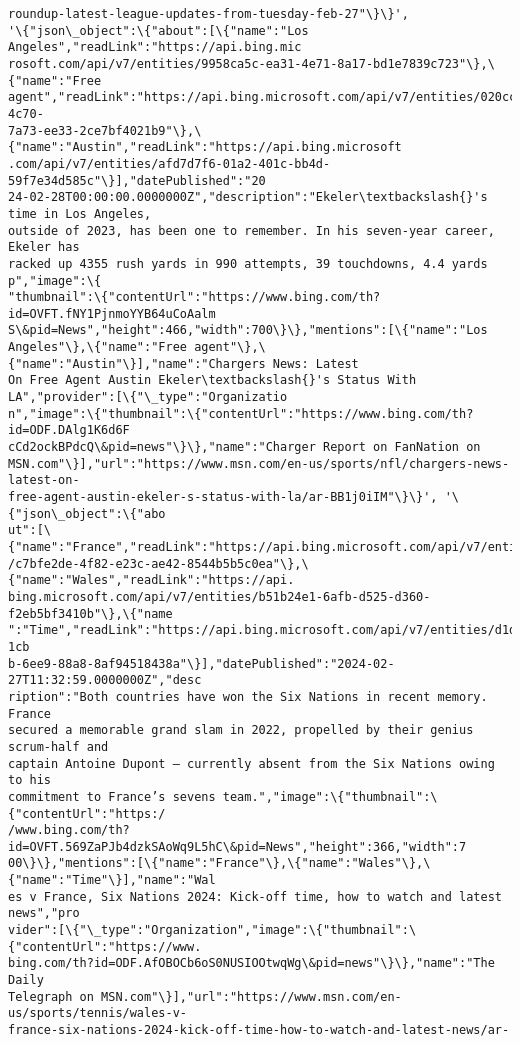 \documentclass[11pt]{article}
\begin{document}
\begin{Verbatim}[commandchars=\\\{\}]
roundup-latest-league-updates-from-tuesday-feb-27"\}\}',
'\{"json\_object":\{"about":[\{"name":"Los Angeles","readLink":"https://api.bing.mic
rosoft.com/api/v7/entities/9958ca5c-ea31-4e71-8a17-bd1e7839c723"\},\{"name":"Free 
agent","readLink":"https://api.bing.microsoft.com/api/v7/entities/020ccd96-4c70-
7a73-ee33-2ce7bf4021b9"\},\{"name":"Austin","readLink":"https://api.bing.microsoft
.com/api/v7/entities/afd7d7f6-01a2-401c-bb4d-59f7e34d585c"\}],"datePublished":"20
24-02-28T00:00:00.0000000Z","description":"Ekeler\textbackslash{}'s time in Los Angeles,
outside of 2023, has been one to remember. In his seven-year career, Ekeler has
racked up 4355 rush yards in 990 attempts, 39 touchdowns, 4.4 yards p","image":\{
"thumbnail":\{"contentUrl":"https://www.bing.com/th?id=OVFT.fNY1PjnmoYYB64uCoAalm
S\&pid=News","height":466,"width":700\}\},"mentions":[\{"name":"Los
Angeles"\},\{"name":"Free agent"\},\{"name":"Austin"\}],"name":"Chargers News: Latest
On Free Agent Austin Ekeler\textbackslash{}'s Status With LA","provider":[\{"\_type":"Organizatio
n","image":\{"thumbnail":\{"contentUrl":"https://www.bing.com/th?id=ODF.DAlg1K6d6F
cCd2ockBPdcQ\&pid=news"\}\},"name":"Charger Report on FanNation on
MSN.com"\}],"url":"https://www.msn.com/en-us/sports/nfl/chargers-news-latest-on-
free-agent-austin-ekeler-s-status-with-la/ar-BB1j0iIM"\}\}', '\{"json\_object":\{"abo
ut":[\{"name":"France","readLink":"https://api.bing.microsoft.com/api/v7/entities
/c7bfe2de-4f82-e23c-ae42-8544b5b5c0ea"\},\{"name":"Wales","readLink":"https://api.
bing.microsoft.com/api/v7/entities/b51b24e1-6afb-d525-d360-f2eb5bf3410b"\},\{"name
":"Time","readLink":"https://api.bing.microsoft.com/api/v7/entities/d1d85ec7-1cb
b-6ee9-88a8-8af94518438a"\}],"datePublished":"2024-02-27T11:32:59.0000000Z","desc
ription":"Both countries have won the Six Nations in recent memory. France
secured a memorable grand slam in 2022, propelled by their genius scrum-half and
captain Antoine Dupont – currently absent from the Six Nations owing to his
commitment to France’s sevens team.","image":\{"thumbnail":\{"contentUrl":"https:/
/www.bing.com/th?id=OVFT.569ZaPJb4dzkSAoWq9L5hC\&pid=News","height":366,"width":7
00\}\},"mentions":[\{"name":"France"\},\{"name":"Wales"\},\{"name":"Time"\}],"name":"Wal
es v France, Six Nations 2024: Kick-off time, how to watch and latest news","pro
vider":[\{"\_type":"Organization","image":\{"thumbnail":\{"contentUrl":"https://www.
bing.com/th?id=ODF.AfOBOCb6oS0NUSIOOtwqWg\&pid=news"\}\},"name":"The Daily
Telegraph on MSN.com"\}],"url":"https://www.msn.com/en-us/sports/tennis/wales-v-
france-six-nations-2024-kick-off-time-how-to-watch-and-latest-news/ar-

\end{Verbatim}
\end{document}
